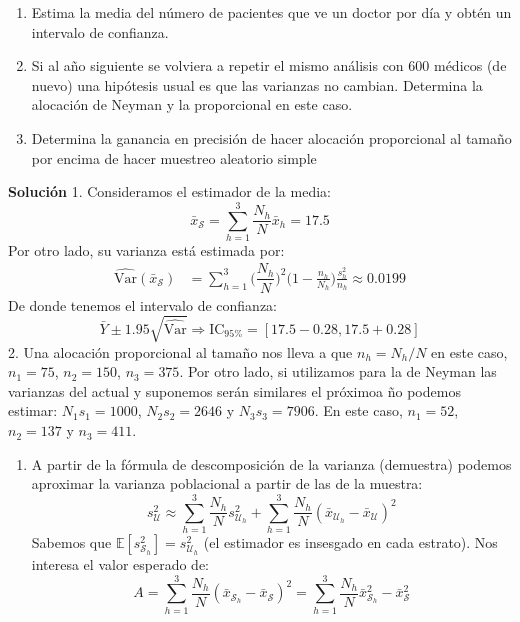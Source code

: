\documentclass[
]{book}
\providecommand{\tightlist}{%
  \setlength{\itemsep}{0pt}\setlength{\parskip}{0pt}}
\begin{document}
\begin{enumerate}
\def\labelenumi{\arabic{enumi}.}
\tightlist
\item
  Estima la media del número de pacientes que ve un doctor por día y obtén un intervalo de confianza.
\item
  Si al año siguiente se volviera a repetir el mismo análisis con \(600\) médicos (de nuevo) una hipótesis usual es que las varianzas no cambian. Determina la alocación de Neyman y la proporcional en este caso.
\item
  Determina la ganancia en precisión de hacer alocación proporcional al tamaño por encima de hacer muestreo aleatorio simple
\end{enumerate}

\textbf{Solución}
1. Consideramos el estimador de la media:
\[
\bar{x}_{\mathcal{S}} = \sum\limits_{h = 1}^3 \dfrac{N_h}{N} \bar{x}_h = 17.5
\]
Por otro lado, su varianza está estimada por:
\begin{equation}\nonumber
\begin{aligned}
\widehat{\textrm{Var}}(\bar{x}_{\mathcal{S}}) & = \sum\limits_{h = 1}^3 \Big( \dfrac{N_h}{N}\Big)^2 \Big( 1 - \frac{n_h}{N_h}\Big) \frac{s^2_h}{n_h} \approx 0.0199
\end{aligned}
\end{equation}
De donde tenemos el intervalo de confianza:
\[
\bar{Y} \pm 1.95\sqrt{\widehat{\textrm{Var}}} \Rightarrow \text{IC}_{95\%} = [17.5 - 0.28, 17.5 + 0.28]
\]
2. Una alocación proporcional al tamaño nos lleva a que \(n_h = N_h / N\) en este caso, \(n_1 = 75\), \(n_2 = 150\), \(n_3 = 375\). Por otro lado, si utilizamos para la de Neyman las varianzas del actual y suponemos serán similares el próximoa ño podemos estimar: \(N_1 s_1 = 1000\), \(N_2 s_2 = 2646\) y \(N_3 s_3 = 7906\). En este caso, \(n_1 = 52\), \(n_2 = 137\) y \(n_3 = 411\).

\begin{enumerate}
\def\labelenumi{\arabic{enumi}.}
\setcounter{enumi}{2}
\tightlist
\item
  A partir de la fórmula de descomposición de la varianza (demuestra) podemos aproximar la varianza poblacional a partir de las de la muestra:
  \[
  s_{\mathcal{U}}^2 \approx \sum\limits_{h = 1}^3 \dfrac{N_h}{N} s^2_{\mathcal{U}_h} + \sum\limits_{h = 1}^3 \dfrac{N_h}{N} (\bar{x}_{\mathcal{U}_h} - \bar{x}_{\mathcal{U}})^2
  \]
  Sabemos que \(\mathbb{E}[s^2_{\mathcal{S}_h}] = s^2_{\mathcal{U}_h}\) (el estimador es insesgado en cada estrato). Nos interesa el valor esperado de:
  \[
  A = \sum\limits_{h = 1}^3 \dfrac{N_h}{N} (\bar{x}_{\mathcal{S}_h} - \bar{x}_{\mathcal{S}})^2 = \sum\limits_{h = 1}^3 \dfrac{N_h}{N} \bar{x}_{\mathcal{S}_h}^2 - \bar{x}_{\mathcal{S}}^2
  \]
\end{enumerate}
\end{document}
